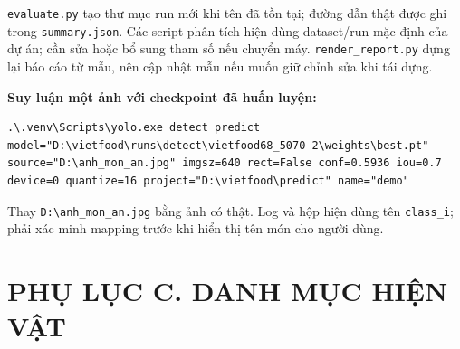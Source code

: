 \documentclass[
  vietnamese,
  12pt,
  a4paper,
]{article}
\begin{document}
\texttt{e\allowbreak{}v\allowbreak{}a\allowbreak{}l\allowbreak{}u\allowbreak{}a\allowbreak{}t\allowbreak{}e\allowbreak{}.\allowbreak{}p\allowbreak{}y\allowbreak{}}
tạo thư mục run mới khi tên đã tồn tại; đường dẫn thật được ghi trong
\texttt{s\allowbreak{}u\allowbreak{}m\allowbreak{}m\allowbreak{}a\allowbreak{}r\allowbreak{}y\allowbreak{}.\allowbreak{}j\allowbreak{}s\allowbreak{}o\allowbreak{}n\allowbreak{}}.
Các script phân tích hiện dùng dataset/run mặc định của dự án; cần sửa
hoặc bổ sung tham số nếu chuyển máy.
\texttt{r\allowbreak{}e\allowbreak{}n\allowbreak{}d\allowbreak{}e\allowbreak{}r\allowbreak{}\_\allowbreak{}r\allowbreak{}e\allowbreak{}p\allowbreak{}o\allowbreak{}r\allowbreak{}t\allowbreak{}.\allowbreak{}p\allowbreak{}y\allowbreak{}}
dựng lại báo cáo từ mẫu, nên cập nhật mẫu nếu muốn giữ chỉnh sửa khi tái
dựng.

\textbf{Suy luận một ảnh với checkpoint đã huấn luyện:}

\begin{Verbatim}[breaklines=true,breakanywhere=true,fontsize=\footnotesize,baselinestretch=1]
.\.venv\Scripts\yolo.exe detect predict model="D:\vietfood\runs\detect\vietfood68_5070-2\weights\best.pt" source="D:\anh_mon_an.jpg" imgsz=640 rect=False conf=0.5936 iou=0.7 device=0 quantize=16 project="D:\vietfood\predict" name="demo"
\end{Verbatim}

Thay
\texttt{D\allowbreak{}:\allowbreak{}\textbackslash{}\allowbreak{}a\allowbreak{}n\allowbreak{}h\allowbreak{}\_\allowbreak{}m\allowbreak{}o\allowbreak{}n\allowbreak{}\_\allowbreak{}a\allowbreak{}n\allowbreak{}.\allowbreak{}j\allowbreak{}p\allowbreak{}g\allowbreak{}}
bằng ảnh có thật. Log và hộp hiện dùng tên
\texttt{c\allowbreak{}l\allowbreak{}a\allowbreak{}s\allowbreak{}s\allowbreak{}\_\allowbreak{}i\allowbreak{}};
phải xác minh mapping trước khi hiển thị tên món cho người dùng.

\section{PHỤ LỤC C. DANH MỤC HIỆN
VẬT}\label{phux1ee5-lux1ee5c-c.-danh-mux1ee5c-hiux1ec7n-vux1eadt}

\begingroup\small\setlength{\tabcolsep}{4pt}\renewcommand{\arraystretch}{1.12}
\end{document}
